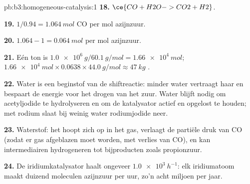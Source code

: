 \begin{solution}{pb:b3:homogeneous-catalysis:1}
\textbf{18.} $\ce{CO + H2O -> CO2 + H2}$.

\textbf{19.} $1/0.94 = \qty{1.064}{mol}$ CO per mol azijnzuur.

\textbf{20.} $1.064 - 1 = \qty{0.064}{mol}$  per mol azijnzuur.

\textbf{21.} Eén ton is $\qty{1.0e6}{g}/\qty{60.1}{g/mol} = \qty{1.66e4}{mol}$; $\qty{1.66e4}{mol} \times 0.0638 \times \qty{44.0}{g/mol} \approx \qty{47}{kg}$ .

\textbf{22.} Water is een beginstof van de shiftreactie: minder water
vertraagt haar en bespaart de energie voor het drogen van het zuur. Water
blijft nodig om acetyljodide te hydrolyseren en om de katalysator actief
en opgelost te houden; met rodium slaat bij weinig water rodiumjodide
neer.

\textbf{23.} Waterstof: het hoopt zich op in het gas, verlaagt de
partiële druk van CO (zodat er gas afgeblazen moet worden, met verlies
van CO), en kan intermediairen hydrogeneren tot bijproducten zoals
propionzuur.

\textbf{24.} De iridiumkatalysator haalt ongeveer $\qty{1.0e3}{h^{-1}}$: elk iridiumatoom maakt
duizend moleculen azijnzuur per uur, zo'n acht miljoen per jaar.
\end{solution}
